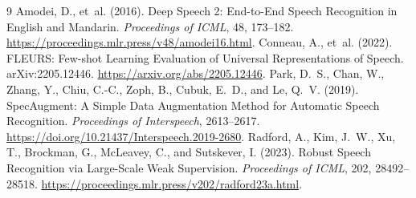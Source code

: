 \documentclass[12pt,a4paper]{report}
\begin{document}
\begin{thebibliography}{9}
Amodei, D., et~al. (2016). Deep Speech 2: End-to-End Speech Recognition in English and Mandarin. \emph{Proceedings of ICML}, 48, 173--182. \url{https://proceedings.mlr.press/v48/amodei16.html}.
Conneau, A., et~al. (2022). FLEURS: Few-shot Learning Evaluation of Universal Representations of Speech. arXiv:2205.12446. \url{https://arxiv.org/abs/2205.12446}.
Park, D.~S., Chan, W., Zhang, Y., Chiu, C.-C., Zoph, B., Cubuk, E.~D., and Le, Q.~V. (2019). SpecAugment: A Simple Data Augmentation Method for Automatic Speech Recognition. \emph{Proceedings of Interspeech}, 2613--2617. \url{https://doi.org/10.21437/Interspeech.2019-2680}.
Radford, A., Kim, J.~W., Xu, T., Brockman, G., McLeavey, C., and Sutskever, I. (2023). Robust Speech Recognition via Large-Scale Weak Supervision. \emph{Proceedings of ICML}, 202, 28492--28518. \url{https://proceedings.mlr.press/v202/radford23a.html}.
\end{thebibliography}
\end{document}
